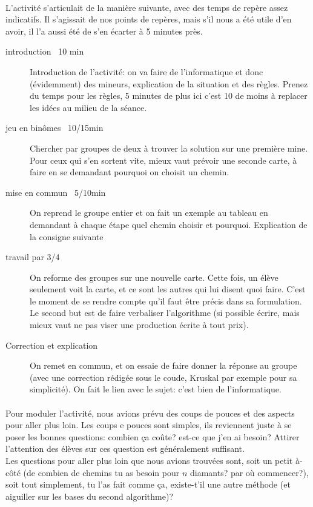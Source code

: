 \documentclass{article}
\begin{document}
 \paragraph{}
 L'activité s'articulait de la manière suivante, avec des temps de repère assez 
 indicatifs. Il s'agissait de nos points de repères, mais s'il nous a été utile 
 d'en avoir, il l'a aussi été de s'en écarter à 5 minutes près.
 \begin{description}
 \item[introduction ~10 min] Introduction de l'activité: on va faire de l'informatique
 et donc (évidemment) des mineurs, explication de la situation et des règles.
 Prenez du temps pour les règles, 5 minutes de plus ici c'est 10 de moins à replacer
 les idées au milieu de la séance.
 \item[jeu en binômes ~10/15min] Chercher par groupes de deux à trouver la 
 solution sur une première mine. Pour ceux qui s'en sortent vite, mieux vaut 
 prévoir une seconde carte, à faire en se demandant pourquoi on choisit un chemin.
 \item[mise en commun ~5/10min] On reprend le groupe entier et on fait un exemple
 au tableau en demandant à chaque étape quel chemin choisir et pourquoi. Explication
 de la consigne suivante
 \item[travail par 3/4] On reforme des groupes sur une nouvelle carte. Cette fois,
 un élève seulement voit la carte, et ce sont les autres qui lui disent quoi faire.
 C'est le moment de se rendre compte qu'il faut être précis dans sa formulation.
 Le second but est de faire verbaliser l'algorithme (si possible écrire, mais mieux
 vaut ne pas viser une production écrite à tout prix).
 \item[Correction et explication] On remet en commun, et on essaie de faire donner
 la réponse au groupe (avec une correction rédigée sous le coude, Kruskal par exemple
 pour sa simplicité). On fait le lien avec le sujet: c'est bien de l'informatique.
 \end{description}
 
 \paragraph{}
 Pour moduler l'activité, nous avions prévu des coups de pouces et des aspects
 pour aller plus loin. Les coups e pouces sont simples, ils reviennent juste à se
 poser les bonnes questions: combien ça coûte? est-ce que j'en ai besoin? Attirer
 l'attention des élèves sur ces question est généralement suffisant.
 \\Les questions pour aller plus loin que nous avions trouvées sont, soit
 un petit à-côté (de combien de chemins tu as besoin pour $n$ diamants? par où
 commencer?), soit tout simplement, tu l'as fait comme ça, existe-t'il une autre 
 méthode (et aiguiller sur les bases du second algorithme)? 
 
\end{document}

